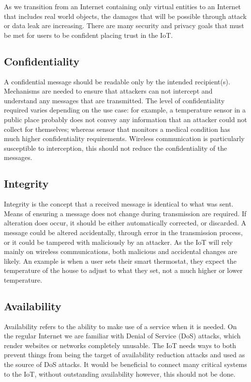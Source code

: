 \documentclass[10pt,journal,compsoc]{IEEEtran}
\begin{document}
As we transition from an Internet containing only virtual entities to an
Internet that includes real world objects, the damages that will be possible
through attack or data leak are increasing. There are many security and privacy
goals that must be met for users to be confident placing trust in the IoT.

\subsection{Confidentiality}
A confidential message should be readable only by the intended recipient(s).
Mechanisms are needed to ensure that attackers can not intercept and understand
any messages that are transmitted. The level of confidentiality required varies
depending on the use case: for example, a temperature sensor in a public place
probably does not convey any information that an attacker could not collect for
themselves; whereas sensor that monitors a medical condition has much higher
confidentiality requirements. Wireless communication is particularly
susceptible to interception, this should not reduce the confidentiality of the
messages.  

\subsection{Integrity}
Integrity is the concept that a received message is identical to what was sent.
Means of ensuring a message does not change during transmission are required.
If alteration does occur, it should be either automatically corrected, or
discarded. A message could be altered accidentally, through error in the
transmission process, or it could be tampered with maliciously by an attacker.
As the IoT will rely mainly on wireless communications, both malicious and
accidental changes are likely. An example is when a user sets their smart
thermostat, they expect the temperature of the house to adjust to what they
set, not a much higher or lower temperature.  

\subsection{Availability}
Availability refers to the ability to make use of a service when it is needed.
On the regular Internet we are familiar with Denial of Service (DoS) attacks,
which render websites or networks completely unusable. The IoT needs ways to
both prevent things from being the target of availability reduction attacks and
used as the source of DoS attacks. It would be beneficial to connect many
critical systems to the IoT, without outstanding availability however, this
should not be done.
\end{document}
